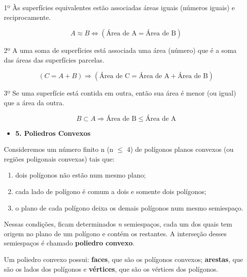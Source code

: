 1º Às superfícies equivalentes estão associadas áreas iguais (números iguais) e reciprocamente.

$$A \approx B \Longleftrightarrow (\text{Área de A} = \text{Área de B})$$

2º A uma soma de superfícies está associada uma área (número) que é a soma das áreas das superfícies parcelas.

$$(C = A + B) \Rightarrow (\text{Área de C} = \text{Área de A} + \text{Área de B})$$

3º Se uma superfície está contida em outra, então sua área é menor (ou igual) que a área da outra.

$$B \subset A \Rightarrow \text{Área de B} \leqslant \text{Área de A}$$




\begin{itemize}
    \item \textbf{5. Poliedros Convexos}
\end{itemize}


Consideremos um número finito n (n $\leqslant$ 4) de polígonos planos convexos (ou regiões poligonais convexas) tais que:

\begin{enumerate}
    \item dois polígonos não estão num mesmo plano;
    \item cada lado de polígono é comum a dois e somente dois polígonos;
    \item o plano de cada polígono deixa os demais polígonos num mesmo semiespaço.
\end{enumerate}

Nessas condições, ficam determinados \textit{n} semiespaços, cada um dos quais tem origem no plano de um polígono e contém os restantes. A interseção desses semiespaços é chamado \textbf{poliedro convexo}.

Um poliedro convexo possui: \textbf{faces}, que são os polígonos convexos; \textbf{arestas}, que são os lados dos polígonos e \textbf{vértices}, que são os vértices dos polígonos.

